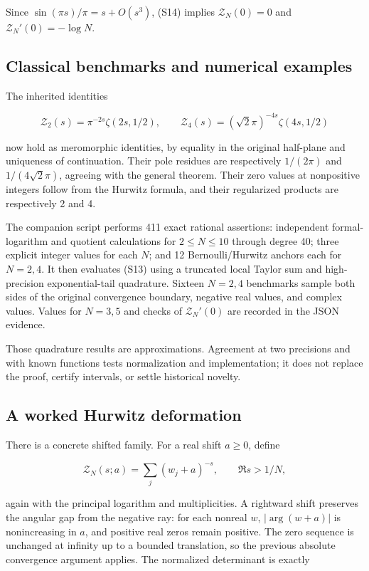 Since \(\sin(\pi s)/\pi=s+O(s^3)\), (S14) implies \(\mathcal Z_N(0)=0\)
and \(\mathcal Z_N'(0)=-\log N\).

\hypertarget{classical-benchmarks-and-numerical-examples}{%
\subsection{Classical benchmarks and numerical
examples}\label{classical-benchmarks-and-numerical-examples}}

The inherited identities

\[
\mathcal Z_2(s)=\pi^{-2s}\zeta(2s,1/2),\qquad
\mathcal Z_4(s)=(\sqrt2\pi)^{-4s}\zeta(4s,1/2)
\]

now hold as meromorphic identities, by equality in the original
half-plane and uniqueness of continuation. Their pole residues are
respectively \(1/(2\pi)\) and \(1/(4\sqrt2\pi)\), agreeing with the
general theorem. Their zero values at nonpositive integers follow from
the Hurwitz formula, and their regularized products are respectively 2
and 4.

The companion script performs 411 exact rational assertions: independent
formal-logarithm and quotient calculations for \(2\le N\le10\) through
degree 40; three explicit integer values for each \(N\); and 12
Bernoulli/Hurwitz anchors each for \(N=2,4\). It then evaluates (S13)
using a truncated local Taylor sum and high-precision exponential-tail
quadrature. Sixteen \(N=2,4\) benchmarks sample both sides of the
original convergence boundary, negative real values, and complex values.
Values for \(N=3,5\) and checks of \(\mathcal Z_N'(0)\) are recorded in
the JSON evidence.

Those quadrature results are approximations. Agreement at two precisions
and with known functions tests normalization and implementation; it does
not replace the proof, certify intervals, or settle historical novelty.

\hypertarget{a-worked-hurwitz-deformation}{%
\subsection{A worked Hurwitz
deformation}\label{a-worked-hurwitz-deformation}}

There is a concrete shifted family. For a real shift \(a\ge0\), define

\[
\mathcal Z_N(s;a)=\sum_j(w_j+a)^{-s},\qquad \Re s>1/N,
\tag{T1}
\]

again with the principal logarithm and multiplicities. A rightward shift
preserves the angular gap from the negative ray: for each nonreal \(w\),
\(|\arg(w+a)|\) is nonincreasing in \(a\), and positive real zeros
remain positive. The zero sequence is unchanged at infinity up to a
bounded translation, so the previous absolute convergence argument
applies. The normalized determinant is exactly

